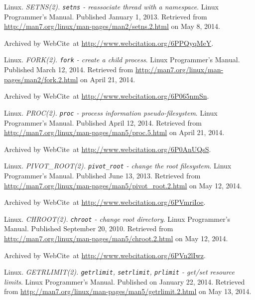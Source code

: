 \begin{thebibliography}{9}
Linux. \emph{SETNS(2). \texttt{setns} - reassociate thread with a namespace}.
Linux Programmer's Manual. Published January 1, 2013.  Retrieved from
\url{http://man7.org/linux/man-pages/man2/setns.2.html} on May 8, 2014.

Archived by WebCite\textsuperscript{\textregistered}\ at
\url{http://www.webcitation.org/6PPQyqMeY}.


Linux. \emph{FORK(2). \texttt{fork} - create a child process}. Linux
Programmer's Manual. Published March 12, 2014. Retrieved from
\url{http://man7.org/linux/man-pages/man2/fork.2.html} on April 21, 2014.

Archived by WebCite\textsuperscript{\textregistered}\ at
\url{http://www.webcitation.org/6P065nmSn}.


Linux. \emph{PROC(2). \texttt{proc} - process information pseudo-filesystem}.
Linux Programmer's Manual. Published April 12, 2014. Retrieved from
\url{http://man7.org/linux/man-pages/man5/proc.5.html} on April 21, 2014.

Archived by WebCite\textsuperscript{\textregistered}\ at
\url{http://www.webcitation.org/6P0AnUQsS}.


Linux. \emph{PIVOT\_ROOT(2). \texttt{pivot\_root} - change the root
filesystem}.  Linux Programmer's Manual. Published June 13, 2013. Retrieved
from \url{http://man7.org/linux/man-pages/man5/pivot_root.2.html} on May 12,
2014.

Archived by WebCite\textsuperscript{\textregistered}\ at
\url{http://www.webcitation.org/6PVmriIoe}.


Linux. \emph{CHROOT(2). \texttt{chroot} - change root directory}.  Linux
Programmer's Manual. Published September 20, 2010. Retrieved from
\url{http://man7.org/linux/man-pages/man5/chroot.2.html} on May 12, 2014.

Archived by WebCite\textsuperscript{\textregistered}\ at
\url{http://www.webcitation.org/6PVn2lIwz}.


Linux. \emph{GETRLIMIT(2). \texttt{getrlimit}, \texttt{setrlimit},
\texttt{prlimit} - get/set resource limits}.  Linux Programmer's Manual.
Published on January 22, 2014. Retrieved from
\url{http://man7.org/linux/man-pages/man5/getrlimit.2.html} on May 13, 2014.


\end{thebibliography}
